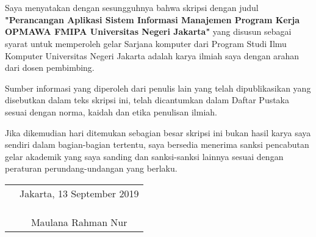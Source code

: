 \chapter*{}

Saya menyatakan dengan sesungguhnya bahwa skripsi dengan judul \textbf{"Perancangan Aplikasi Sistem Informasi Manajemen Program Kerja OPMAWA FMIPA Universitas Negeri Jakarta"} yang disusun sebagai syarat untuk memperoleh gelar Sarjana komputer dari Program Studi Ilmu Komputer Universitas Negeri Jakarta adalah karya ilmiah saya dengan arahan dari dosen pembimbing.

Sumber informasi yang diperoleh dari penulis lain yang
telah dipublikasikan yang disebutkan dalam teks skripsi ini, telah dicantumkan dalam Daftar Pustaka sesuai dengan norma, kaidah dan etika penulisan ilmiah.

Jika dikemudian hari ditemukan sebagian besar skripsi ini bukan hasil karya saya sendiri dalam bagian-bagian tertentu, saya bersedia menerima sanksi pencabutan gelar akademik yang saya sanding dan sanksi-sanksi lainnya sesuai dengan peraturan perundang-undangan yang berlaku.

\vspace{.5cm}

\begin{tabular}{p{7.5cm}c}
	&Jakarta, 13 September 2019\\
	&\\
	&\\
	&\\
	&Maulana Rahman Nur
\end{tabular}